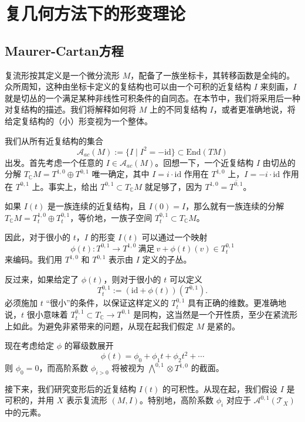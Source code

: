 \chapter{复几何方法下的形变理论}

\section{Maurer-Cartan方程}

复流形按其定义是一个微分流形 $M$，配备了一族坐标卡，其转移函数是全纯的。众所周知，这种由坐标卡定义的复结构也可以由一个可积的近复结构 $I$ 来刻画，$I$ 就是切丛的一个满足某种非线性可积条件的自同态。在本节中，我们将采用后一种对复结构的描述。我们将解释如何将 $M$ 上的不同复结构 $I$，或者更准确地说，将给定复结构的（小）形变视为一个整体。

我们从所有近复结构的集合\[
    \mathcal{A}_{ac}(M):=\{I\mid I^2=-\mathrm{id}\}\subset \mathrm{End}(TM)
\]出发。首先考虑一个任意的 $I\in \mathcal{A}_{ac}(M)$。回想一下，一个近复结构 $I$ 由切丛的分解 $T_{\mathbb{C}}M=T^{1,0}\oplus T^{0,1}$ 唯一确定，其中 $I=i\cdot \mathrm{id}$ 作用在 $T^{1,0}$ 上，$I=-i\cdot\mathrm{id}$ 作用在 $T^{0,1}$ 上。事实上，给出 $T^{0,1}\subset T_{\mathbb{C}}M$ 就足够了，因为 $T^{1,0}=\overline{T^{0,1}}$。

如果 $I(t)$ 是一族连续的近复结构，且 $I(0)=I$，那么就有一族连续的分解 $T_{\mathbb{C}}M=T^{1,0}_t\oplus T^{0,1}_t$，等价地，一族子空间 $T^{0,1}_t\subset T_{\mathbb{C}}M$。

因此，对于很小的 $t$，$I$ 的形变 $I(t)$ 可以通过一个映射\[
    \phi(t):T^{0,1}\rightarrow T^{1,0}\ \text{满足}\ v+\phi(t)(v)\in T^{0,1}_t
\]来编码。我们用 $T^{1,0}$ 和 $T^{0,1}$ 表示由 $I$ 定义的子丛。

反过来，如果给定了 $\phi(t)$，则对于很小的 $t$ 可以定义\[
    T^{0,1}_t:=(\mathrm{id}+\phi(t))(T^{0,1}).
\]必须施加 $t$ “很小”的条件，以保证这样定义的 $T^{0,1}_t$ 具有正确的维数。更准确地说，$t$ 很小意味着 $T^{0,1}_t\subset T_{\mathbb{C}}\rightarrow T^{0,1}$ 是同构，这当然是一个开性质，至少在紧流形上如此。为避免非紧带来的问题，从现在起我们假定 $M$ 是紧的。

现在考虑给定 $\phi$ 的幂级数展开\[
    \phi(t)=\phi_0+\phi_1 t+\phi_2 t^2+\cdots
\]则 $\phi_0=0$，而高阶系数 $\phi_{i>0}$ 将被视为 $\bigwedge^{0,1}\otimes T^{1,0}$ 的截面。

接下来，我们研究变形后的近复结构 $I(t)$ 的可积性。从现在起，我们假设 $I$ 是可积的，并用 $X$ 表示复流形 $(M,I)$。特别地，高阶系数 $\phi_i$ 对应于 $\mathcal{A}^{0,1}(\mathcal{T}_X)$ 中的元素。

